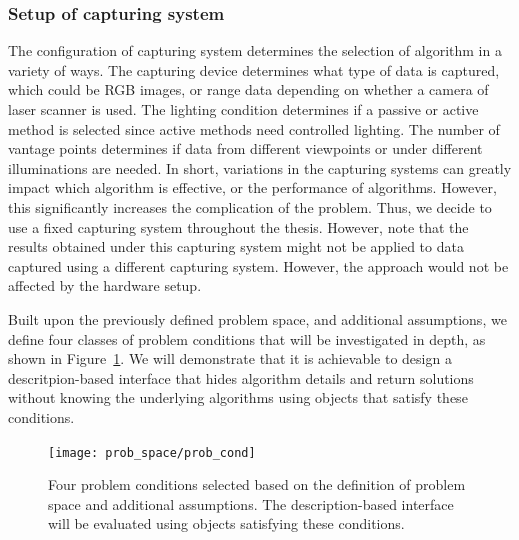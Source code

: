 \subsubsection{Setup of capturing system}
The configuration of capturing system determines the selection of algorithm in a variety of ways. The capturing device determines what type of data is captured, which could be RGB images, or range data depending on whether a camera of laser scanner is used. The lighting condition determines if a passive or active method is selected since active methods need controlled lighting. The number of vantage points determines if data from different viewpoints or under different illuminations are needed. In short, variations in the capturing systems can greatly impact which algorithm is effective, or the performance of algorithms. However, this significantly increases the complication of the problem. Thus, we decide to use a fixed capturing system throughout the thesis. However, note that the results obtained under this capturing system might not be applied to data captured using a different capturing system. However, the approach would not be affected by the hardware setup.

Built upon the previously defined problem space, and additional assumptions, we define four classes of problem conditions that will be investigated in depth, as shown in Figure~\ref{fig:prob_cond}. We will demonstrate that it is achievable to design a descritpion-based interface that hides algorithm details and return solutions without knowing the underlying algorithms using objects that satisfy these conditions.
\begin{figure}[!htbp]
\centering
\texttt{[image: prob\_space/prob\_cond]}
\caption{Four problem conditions selected based on the definition of problem space and additional assumptions. The description-based interface will be evaluated using objects satisfying these conditions.}
\label{fig:prob_cond}
\end{figure}

